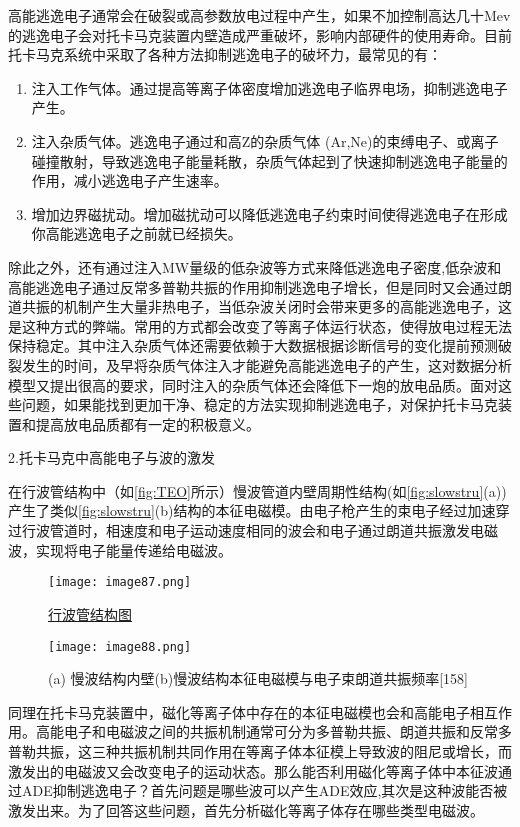高能逃逸电子通常会在破裂或高参数放电过程中产生，如果不加控制高达几十Mev的逃逸电子会对托卡马克装置内壁造成严重破坏，影响内部硬件的使用寿命。目前托卡马克系统中采取了各种方法抑制逃逸电子的破坏力，最常见的有：
\begin{enumerate}
\item [(a)]
注入工作气体。通过提高等离子体密度增加逃逸电子临界电场，抑制逃逸电子产生\cite{RN954}。
\item[(b)]
	注入杂质气体。逃逸电子通过和高Z的杂质气体 (Ar,Ne)的束缚电子、或离子碰撞散射，导致逃逸电子能量耗散，杂质气体起到了快速抑制逃逸电子能量的作用，减小逃逸电子产生速率\cite{RN2118}。
\item[(c)]
	增加边界磁扰动。增加磁扰动可以降低逃逸电子约束时间使得逃逸电子在形成你高能逃逸电子之前就已经损失\cite{RN1485}。
\end{enumerate}
除此之外，还有通过注入MW量级的低杂波等方式来降低逃逸电子密度\cite{RN1866},低杂波和高能逃逸电子通过反常多普勒共振的作用抑制逃逸电子增长，但是同时又会通过朗道共振的机制产生大量非热电子，当低杂波关闭时会带来更多的高能逃逸电子，这是这种方式的弊端。常用的方式都会改变了等离子体运行状态，使得放电过程无法保持稳定。其中注入杂质气体还需要依赖于大数据根据诊断信号的变化提前预测破裂发生的时间，及早将杂质气体注入才能避免高能逃逸电子的产生，这对数据分析模型又提出很高的要求，同时注入的杂质气体还会降低下一炮的放电品质。面对这些问题，如果能找到更加干净、稳定的方法实现抑制逃逸电子，对保护托卡马克装置和提高放电品质都有一定的积极意义。
\par \noindent
2.托卡马克中高能电子与波的激发


在行波管结构中（如\autoref{fig:TEO}所示）慢波管道内壁周期性结构(如\autoref{fig:slowstru}(a))产生了类似\autoref{fig:slowstru}(b)结构的本征电磁模\cite{RN2120}。由电子枪产生的束电子经过加速穿过行波管道时，相速度和电子运动速度相同的波会和电子通过朗道共振激发电磁波，实现将电子能量传递给电磁波。
\begin{figure}
\centering
\texttt{[image: image87.png]}
\caption{\label{fig:TEO}\href{https://electronicsdesk.com/travelling-wave-tube.html}{行波管结构图}	}
\end{figure}
\begin{figure}
\centering
\texttt{[image: image88.png]}
\caption{\label{fig:slowstru}(a) 慢波结构内壁(b)慢波结构本征电磁模与电子束朗道共振频率[158]	}
\end{figure}

同理在托卡马克装置中，磁化等离子体中存在的本征电磁模也会和高能电子相互作用。高能电子和电磁波之间的共振机制通常可分为多普勒共振、朗道共振和反常多普勒共振，这三种共振机制共同作用在等离子体本征模上导致波的阻尼或增长，而激发出的电磁波又会改变电子的运动状态。那么能否利用磁化等离子体中本征波通过ADE抑制逃逸电子？首先问题是哪些波可以产生ADE效应,其次是这种波能否被激发出来。为了回答这些问题，首先分析磁化等离子体存在哪些类型电磁波。

